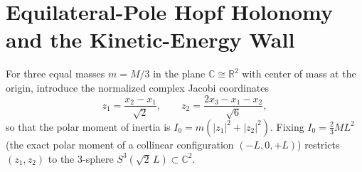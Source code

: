 \documentclass[11pt]{amsart}
\numberwithin{equation}{section}
\theoremstyle{plain}
\theoremstyle{definition}\newtheorem{definition}[theorem]{Definition}
\theoremstyle{remark}\newtheorem{remark}[theorem]{Remark}
\newcommand{\R}{\mathbb{R}}
\newcommand{\C}{\mathbb{C}}
\begin{document}
\section{Equilateral-Pole Hopf Holonomy and the Kinetic-Energy Wall}
For three equal masses $m = M/3$ in the plane $\C \cong \R^2$ with center of mass at the origin, introduce the normalized complex Jacobi coordinates \cite{iwai1987,montgomery1993}
\begin{equation}\label{eq:jacobi}
z_1 = \frac{x_2 - x_1}{\sqrt{2}}, \qquad z_2 = \frac{2 x_3 - x_1 - x_2}{\sqrt{6}},
\end{equation}
so that the polar moment of inertia is $I_0 = m(|z_1|^2 + |z_2|^2)$. Fixing $I_0 = \frac23 M L^2$ (the exact polar moment of a collinear configuration $(-L, 0, +L)$) restricts $(z_1, z_2)$ to the $3$-sphere $S^3(\sqrt{2}\,L) \subset \C^2$.
\end{document}
